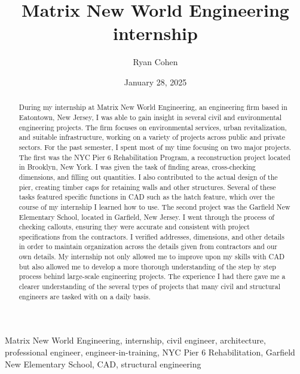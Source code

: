\documentclass[12pt,conference,onecolumn]{IEEEtran}
\title{Matrix New World Engineering internship}
\author{Ryan Cohen}
\date{January 28, 2025}
\newcommand{\keywords}{Matrix New World Engineering, internship, civil engineer, architecture, professional engineer, engineer-in-training, NYC Pier 6 Rehabilitation, Garfield New Elementary School, CAD, structural engineering}
\begin{document}
\maketitle 

\begin{abstract}
During my internship at Matrix New World Engineering, an engineering firm based in Eatontown, New Jersey, I was able to gain insight in several civil and environmental engineering projects. The firm focuses on environmental services, urban revitalization, and suitable infrastructure, working on a variety of projects across public and private sectors. For the past semester, I spent most of my time focusing on two major projects. The first was the NYC Pier 6 Rehabilitation Program, a reconstruction project located in Brooklyn, New York. I was given the task of finding areas, cross-checking dimensions, and filling out quantities. I also contributed to the actual design of the pier, creating timber caps for retaining walls and other structures. Several of these tasks featured specific functions in CAD such as the hatch feature, which over the course of my internship I learned how to use. The second project was the Garfield New Elementary School, located in Garfield, New Jersey. I went through the process of checking callouts, ensuring they were accurate and consistent with project specifications from the contractors. I verified addresses, dimensions, and other details in order to maintain organization across the details given from contractors and our own details. My internship not only allowed me to improve upon my skills with CAD but also allowed me to develop a more thorough understanding of the step by step process behind large-scale engineering projects. The experience I had there gave me a clearer understanding of the several types of projects that many civil and structural engineers are tasked with on a daily basis.
\end{abstract}

\begin{IEEEkeywords}
\keywords
\end{IEEEkeywords}
\end{document}
